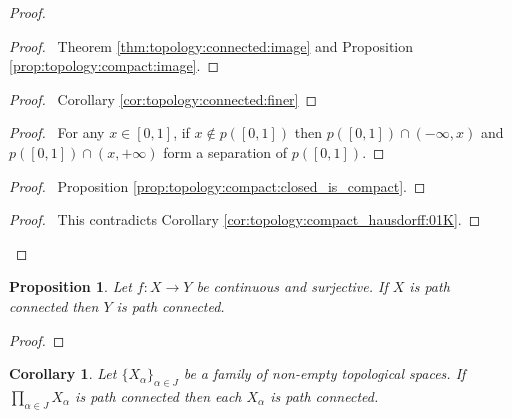 \documentclass{report}
\let\qed\relax
\newtheorem{prop}[lm]{Proposition}
\newtheorem{cor}{Corollary}[lm]
\theoremstyle{definition}
\begin{document}
\begin{proof}
 \pf
   \begin{proof}
     \pf\ Theorem \ref{thm:topology:connected:image} and Proposition
\ref{prop:topology:compact:image}.
\end{proof}
   \begin{proof}
     \pf\ Corollary \ref{cor:topology:connected:finer}
   \end{proof}

   \begin{proof}
     \pf\ For any $x \in [0,1]$, if $x \notin p([0,1])$ then $p([0,1]) \cap
(-\infty, x)$ and $p([0,1]) \cap (x, + \infty)$ form a separation of $p([0,1])$.
\end{proof}
   \begin{proof}
     \pf\ Proposition \ref{prop:topology:compact:closed_is_compact}.
   \end{proof}
   \qedstep
   \begin{proof}
     \pf\ This contradicts Corollary \ref{cor:topology:compact_hausdorff:01K}.
   \end{proof}
   \qed
\end{proof}

\begin{prop}
 Let $f : X \rightarrow Y$ be continuous and surjective. If $X$ is path
connected then $Y$ is path connected.
\end{prop}

\begin{proof}
 \pf
 \qed
\end{proof}

\begin{cor}
  Let $\{ X_\alpha \}_{\alpha \in J}$ be a family of non-empty topological
  spaces. If $\prod_{\alpha \in J} X_\alpha$ is path connected then each
$X_\alpha$ is path connected.
\end{cor}
\end{document}
